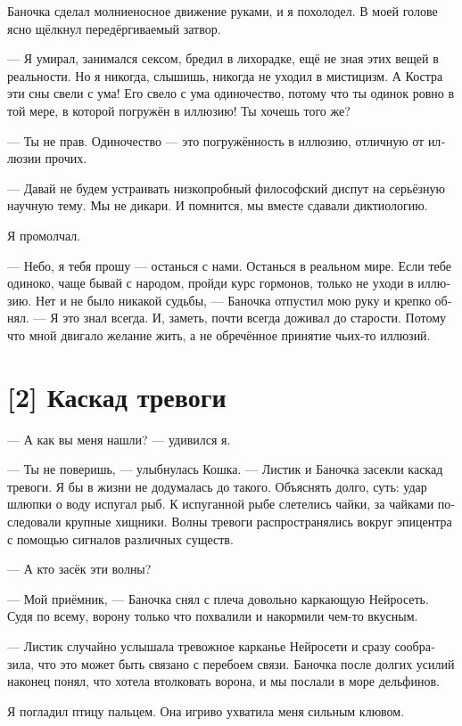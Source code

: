 \documentclass[a4paper,12pt,fleqn]{book}\usepackage{cooltooltips}\usepackage{polyglossia}\setdefaultlanguage[babelshorthands=true]{russian}\setotherlanguage{english}\defaultfontfeatures{Ligatures=TeX,Mapping=tex-text} \usepackage{xcolor}\definecolor{lightgray}{HTML}{bbbbbb}\color{lightgray}\newcommand{\ml}[3]{\textenglish{\textcolor{black}{#3}}}
\begin{document}
{Баночка сделал молниеносное движение руками, и я похолодел.
В моей голове ясно щёлкнул передёргиваемый затвор.

--- Я умирал, занимался сексом, бредил в лихорадке, ещё не зная этих вещей в реальности.
Но я никогда, слышишь, никогда не уходил в мистицизм.
А Костра эти сны свели с ума!
Его свело с ума одиночество, потому что ты одинок ровно в той мере, в которой погружён в иллюзию!
Ты хочешь того же?

--- Ты не прав.
Одиночество --- это погружённость в иллюзию, отличную от иллюзии прочих.

--- Давай не будем устраивать низкопробный философский диспут на серьёзную научную тему.
Мы не дикари.
И помнится, мы вместе сдавали диктиологию.

Я промолчал.

--- Небо, я тебя прошу --- останься с нами.
Останься в реальном мире.
Если тебе одиноко, чаще бывай с народом, пройди курс гормонов, только не уходи в иллюзию.
Нет и не было никакой судьбы, --- Баночка отпустил мою руку и крепко обнял.
--- Я это знал всегда.
И, заметь, почти всегда доживал до старости.
Потому что мной двигало желание жить, а не обречённое принятие чьих-то иллюзий.

\section{[2] Каскад тревоги}

--- А как вы меня нашли? --- удивился я.

--- Ты не поверишь, --- улыбнулась Кошка.
--- Листик и Баночка засекли каскад тревоги.
Я бы в жизни не додумалась до такого.
Объяснять долго, суть: удар шлюпки о воду испугал рыб.
К испуганной рыбе слетелись чайки, за чайками последовали крупные хищники.
Волны тревоги распространялись вокруг эпицентра с помощью сигналов различных существ.

--- А кто засёк эти волны?

--- Мой приёмник, --- Баночка снял с плеча довольно каркающую Нейросеть.
Судя по всему, ворону только что похвалили и накормили чем-то вкусным.

--- Листик случайно услышала тревожное карканье Нейросети и сразу сообразила, что это может быть связано с перебоем связи.
Баночка после долгих усилий наконец понял, что хотела втолковать ворона, и мы послали в море дельфинов.

Я погладил птицу пальцем.
Она игриво ухватила меня сильным клювом.

}
\end{document}
